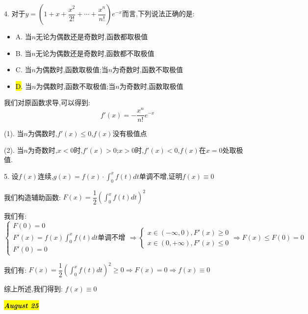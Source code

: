 4. 对于$y=\left(1+x+\dfrac{x^2}{2!}+\cdots+\dfrac{x^n}{n!} \right)e^{-x}$而言,下列说法正确的是:  
\begin{itemize}
	\item A. 当$n$无论为偶数还是奇数时,函数都取极值
	\item B. 当$n$无论为偶数还是奇数时,函数都不取极值
	\item C. 当$n$为偶数时,函数取极值;当$n$为奇数时,函数不取极值
	\item \hl{D}. 当$n$为偶数时,函数不取极值;当$n$为奇数时,函数取极值
\end{itemize}
\begin{solution}

	我们对原函数求导,可以得到:  
	$$f'(x)=-\dfrac{x^{n}}{n!}e^{-x}$$
	
	(1). 当$n$为偶数时,$f'(x)\leq 0$,$f(x)$没有极值点
	
	(2). 当$n$为奇数时,$x<0$时,$f'(x)>0$;$x>0$时,$f'(x)<0$,$f(x)$在$x=0$处取极值.
\end{solution}

5. 设$f(x)$连续,$g(x)=f(x)\cdot\int_{0}^{x}f(t)dt$单调不增,证明$f(x)\equiv 0$
\begin{solution}

	我们构造辅助函数:  $F(x)=\dfrac{1}{2}\left(\int_{0}^{x}f(t)dt \right)^2$
	
	我们有:  $$\left\lbrace
	\begin{array}{l}
		F(0)=0\\
		F'(x)=f(x)\int_{0}^{x}f(t)dt\text{单调不增}\\
		F'(0)=0
	\end{array}
	\right. \Rightarrow \left\lbrace
	\begin{array}{l}
		x\in(-\infty,0),F'(x)\geq 0\\
		x\in(0,+\infty),F'(x)\leq 0
	\end{array}
	\right. \Rightarrow F(x)\leq F(0)=0$$
	
	我们有:  $F(x)=\dfrac{1}{2}\left(\int_{0}^{x}f(t)dt \right)^2\geq 0\Rightarrow F(x)=0\Rightarrow f(x)\equiv 0$
	
	综上所述,我们得到:  $f(x)\equiv 0$
\end{solution}

\hl{\textbf{\textit{August 25}}}

